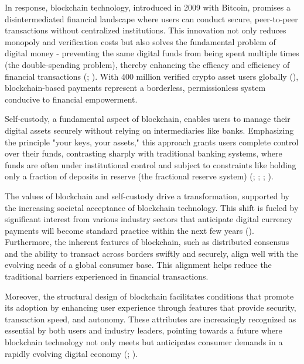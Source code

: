 \documentclass[twocolumn]{article}
\begin{document}
In response, blockchain technology, introduced in 2009 with Bitcoin, promises a disintermediated financial landscape where users can conduct secure, peer-to-peer transactions without centralized institutions. This innovation not only reduces monopoly and verification costs but also solves the fundamental problem of digital money - preventing the same digital funds from being spent multiple times  (the double-spending problem), thereby enhancing the efficacy and efficiency of financial transactions (\cite{chen_blockchain_2020}; \cite{nakamoto_bitcoin_2009}). With 400 million verified crypto asset users globally (\cite{noauthor_crypto_2022}), blockchain-based payments represent a borderless, permissionless system conducive to financial empowerment.

Self-custody, a fundamental aspect of blockchain, enables users to manage their digital assets securely without relying on intermediaries like banks. Emphasizing the principle "your keys, your assets," this approach grants users complete control over their funds, contrasting sharply with traditional banking systems, where funds are often under institutional control and subject to constraints like holding only a fraction of deposits in reserve (the fractional reserve system) (\cite{huang_beginners_2023}; \cite{lesavre_blockchain_2021}; \cite{moniruzzaman_examining_2020}; \cite{pimentel_systemizing_2021}).

The values of blockchain and self-custody drive a transformation, supported by the increasing societal acceptance of blockchain technology. This shift is fueled by significant interest from various industry sectors that anticipate digital currency payments will become standard practice within the next few years (\cite{aron_digital_2022}). Furthermore, the inherent features of blockchain, such as distributed consensus and the ability to transact across borders swiftly and securely, align well with the evolving needs of a global consumer base. This alignment helps reduce the traditional barriers experienced in financial transactions.

Moreover, the structural design of blockchain facilitates conditions that promote its adoption by enhancing user experience through features that provide security, transaction speed, and autonomy. These attributes are increasingly recognized as essential by both users and industry leaders, pointing towards a future where blockchain technology not only meets but anticipates consumer demands in a rapidly evolving digital economy (\cite{zhang_security_2020}; \cite{habib_blockchain_2022}).
\end{document}
